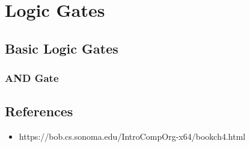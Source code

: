 \chapter{Logic Gates}

\section{Basic Logic Gates}

\subsection{AND Gate}



\section{References}

\begin{itemize}
	\item https://bob.cs.sonoma.edu/IntroCompOrg-x64/bookch4.html
\end{itemize}